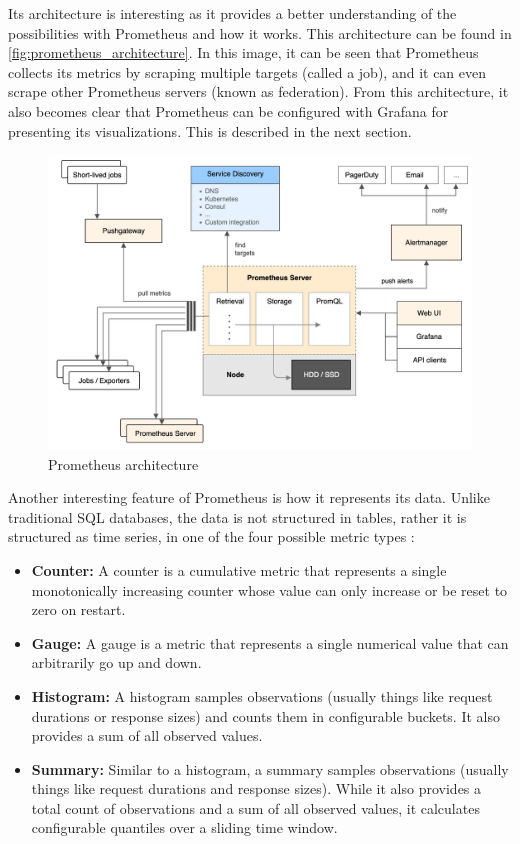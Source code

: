 Its architecture is interesting as it provides a better understanding of the possibilities with Prometheus and how it works. This architecture can be found in \autoref{fig:prometheus_architecture}. In this image, it can be seen that Prometheus collects its metrics by scraping multiple targets (called a job), and it can even scrape other Prometheus servers (known as federation). From this architecture, it also becomes clear that Prometheus can be configured with Grafana for presenting its visualizations. This is described in the next section.\\

\begin{figure}
    \centering
    \includegraphics[width=\textwidth]{gfx/prometheus_architecture.png}
    \caption{Prometheus architecture}
    \label{fig:prometheus_architecture}
\end{figure}

Another interesting feature of Prometheus is how it represents its data. Unlike traditional SQL databases, the data is not structured in tables, rather it is structured as time series, in one of the four possible metric types \cite{prometheus_metrics}:
\begin{itemize}
    \item \textbf{Counter: }A counter is a cumulative metric that represents a single monotonically increasing counter whose value can only increase or be reset to zero on restart.
    \item \textbf{Gauge: }A gauge is a metric that represents a single numerical value that can arbitrarily go up and down.
    \item \textbf{Histogram: }A histogram samples observations (usually things like request durations or response sizes) and counts them in configurable buckets. It also provides a sum of all observed values.
    \item \textbf{Summary: }Similar to a histogram, a summary samples observations (usually things like request durations and response sizes). While it also provides a total count of observations and a sum of all observed values, it calculates configurable quantiles over a sliding time window.
\end{itemize}

